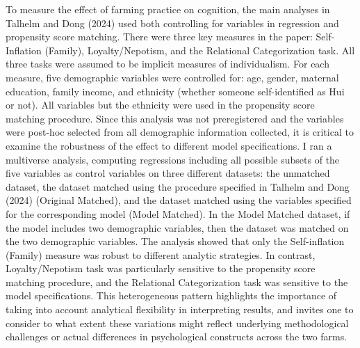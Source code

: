 \documentclass[
  man]{apa6}
\begin{document}
To measure the effect of farming practice on cognition, the main analyses in Talhelm and Dong (2024) used both controlling for variables in regression and propensity score matching. There were three key measures in the paper: Self-Inflation (Family), Loyalty/Nepotism, and the Relational Categorization task. All three tasks were assumed to be implicit measures of individualism. For each measure, five demographic variables were controlled for: age, gender, maternal education, family income, and ethnicity (whether someone self-identified as Hui or not). All variables but the ethnicity were used in the propensity score matching procedure. Since this analysis was not preregistered and the variables were post-hoc selected from all demographic information collected, it is critical to examine the robustness of the effect to different model specifications. I ran a multiverse analysis, computing regressions including all possible subsets of the five variables as control variables on three different datasets: the unmatched dataset, the dataset matched using the procedure specified in Talhelm and Dong (2024) (Original Matched), and the dataset matched using the variables specified for the corresponding model (Model Matched). In the Model Matched dataset, if the model includes two demographic variables, then the dataset was matched on the two demographic variables. The analysis showed that only the Self-inflation (Family) measure was robust to different analytic strategies. In contrast, Loyalty/Nepotism task was particularly sensitive to the propensity score matching procedure, and the Relational Categorization task was sensitive to the model specifications. This heterogeneous pattern highlights the importance of taking into account analytical flexibility in interpreting results, and invites one to consider to what extent these variations might reflect underlying methodological challenges or actual differences in psychological constructs across the two farms.
\end{document}
